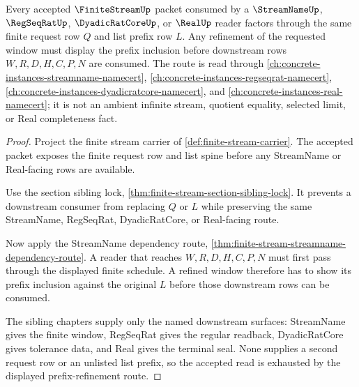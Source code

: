 \begin{theorem}
\label{thm:finite-stream-prefix-refinement-window-exhaustion}
Every accepted $\FiniteStreamUp$ packet consumed by a $\StreamNameUp$, $\RegSeqRatUp$, $\DyadicRatCoreUp$, or $\RealUp$ reader factors through the same finite request row $Q$ and list prefix row $L$. Any refinement of the requested window must display the prefix inclusion before downstream rows $W,R,D,H,C,P,N$ are consumed. The route is read through \autoref{ch:concrete-instances-streamname-namecert}, \autoref{ch:concrete-instances-regseqrat-namecert}, \autoref{ch:concrete-instances-dyadicratcore-namecert}, and \autoref{ch:concrete-instances-real-namecert}; it is not an ambient infinite stream, quotient equality, selected limit, or Real completeness fact.
\end{theorem}
\begin{proof}
Project the finite stream carrier of \autoref{def:finite-stream-carrier}. The accepted packet exposes the finite request row and list spine before any StreamName or Real-facing rows are available.

Use the section sibling lock, \autoref{thm:finite-stream-section-sibling-lock}. It prevents a downstream consumer from replacing $Q$ or $L$ while preserving the same StreamName, RegSeqRat, DyadicRatCore, or Real-facing route.

Now apply the StreamName dependency route, \autoref{thm:finite-stream-streamname-dependency-route}. A reader that reaches $W,R,D,H,C,P,N$ must first pass through the displayed finite schedule. A refined window therefore has to show its prefix inclusion against the original $L$ before those downstream rows can be consumed.

The sibling chapters supply only the named downstream surfaces: StreamName gives the finite window, RegSeqRat gives the regular readback, DyadicRatCore gives tolerance data, and Real gives the terminal seal. None supplies a second request row or an unlisted list prefix, so the accepted read is exhausted by the displayed prefix-refinement route.
\end{proof}


